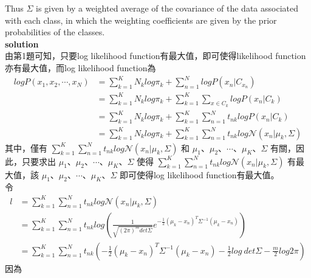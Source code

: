 \documentclass{article}
\begin{document}
Thus $\Sigma$ is given by a weighted average of the covariance of the data associated with each class, in which the weighting coefficients are given by the prior probabilities of the classes.\\

\noindent
{\bf \large solution}\\

\noindent
由第1題可知，只要log likelihood function有最大值，即可使得likelihood function亦有最大值，而log likelihood function為
\begin{align*}
    log P(x_1, x_2, \cdots, x_N) &= \sum_{k = 1}^K N_k log \pi_k + \sum_{n = 1}^N log P(x_n | C_{x_n})\\
    &= \sum_{k = 1}^K N_k log \pi_k + \sum_{k = 1}^K \sum_{x \in C_k} log P(x_n | C_k)\\
    &= \sum_{k = 1}^K N_k log \pi_k + \sum_{k = 1}^K \sum_{n = 1}^N t_{nk} log P(x_n | C_k)\\
    &= \sum_{k = 1}^K N_k log \pi_k + \sum_{k = 1}^K \sum_{n = 1}^N t_{nk} log {\mathcal N}(x_n|\mu_k, \Sigma)
\end{align*}
其中，僅有 $\sum_{k = 1}^K \sum_{n = 1}^N t_{nk} log {\mathcal N}(x_n|\mu_k, \Sigma)$ 和 $\mu_1$、$\mu_2$、$\cdots$、$\mu_K$、$\Sigma$ 有關，因此，只要求出 $\mu_1$、$\mu_2$、$\cdots$、$\mu_K$、$\Sigma$ 使得 $\sum_{k = 1}^K \sum_{n = 1}^N t_{nk} log {\mathcal N}(x_n|\mu_k, \Sigma)$ 有最大值，該 $\mu_1$、$\mu_2$、$\cdots$、$\mu_K$、$\Sigma$ 即可使得log likelihood function有最大值。\\
令
\begin{align*}
    l &= \sum_{k = 1}^K \sum_{n = 1}^N t_{nk} log {\mathcal N}(x_n|\mu_k, \Sigma)\\
    &= \sum_{k = 1}^K \sum_{n = 1}^N t_{nk} log(\frac{1}{\sqrt{(2 \pi)^m det \Sigma}} e^{-\frac{1}{2} (\mu_k - x_n)^T \Sigma^{-1} (\mu_k - x_n)})\\
    &= \sum_{k = 1}^K \sum_{n = 1}^N t_{nk} (-\frac{1}{2} (\mu_k - x_n)^T \Sigma^{-1} (\mu_k - x_n) - \frac{1}{2} log\ det \Sigma - \frac{m}{2} log 2 \pi)
\end{align*}
因為
\end{document}
